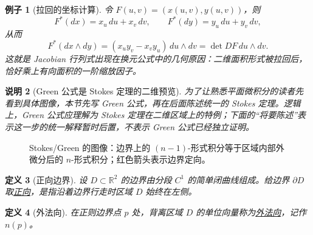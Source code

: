 \documentclass[UTF8,fontset=none,a4paper,11pt]{ctexart}
\theoremstyle{foundation-definition}
\newtheorem{definition}{定义}[section]
\theoremstyle{foundation-theorem}
\theoremstyle{foundation-proposition}
\theoremstyle{foundation-example}
\newtheorem{example}[definition]{例子}
\theoremstyle{foundation-remark}
\newtheorem{remark}[definition]{说明}
\theoremstyle{foundation-theorem}
\newcommand{\term}[2]{\hyperref[#1]{#2}}
\begin{document}
\begin{example}[拉回的坐标计算]
令 \(F(u,v)=(x(u,v),y(u,v))\)，则
\[
 F^*(dx)=x_u\,du+x_v\,dv,
 \qquad
 F^*(dy)=y_u\,du+y_v\,dv,
\]
从而
\[
 F^*(dx\wedge dy)
 =(x_uy_v-x_vy_u)\,du\wedge dv
 =\det DF\,du\wedge dv.
\]
这就是 Jacobian 行列式出现在换元公式中的几何原因：二维面积形式被拉回后，恰好乘上有向面积的一阶缩放因子。
\end{example}

\begin{remark}[Green 公式是 Stokes 定理的二维预览]
为了让熟悉平面微积分的读者先看到具体图像，本节先写 Green 公式，再在后面陈述统一的 Stokes 定理。逻辑上，Green 公式应理解为 Stokes 定理在二维区域上的特例；下面的“将要陈述”表示这一步的统一解释暂时后置，不表示 Green 公式已经独立证明。
\end{remark}

\begin{figure}[htbp]
\centering
{}
\caption{Stokes/Green 的图像：边界上的 \((n-1)\)-形式积分等于区域内部外微分后的 \(n\)-形式积分；红色箭头表示边界定向。}
\label{fig:stokes-boundary-region}
\end{figure}

\begin{definition}[正向边界]\label{def:positive-boundary}
设 \(D\subset\mathbb R^2\) 的边界由分段 \(C^1\) 的简单闭曲线组成。给边界
\(\partial D\) 取\term{def:positive-boundary}{正向}，是指沿着边界行走时区域 \(D\) 始终在左侧。
\end{definition}

\begin{definition}[外法向]\label{def:outward-normal}
在正则边界点 \(p\) 处，背离区域 \(D\) 的单位向量称为\term{def:outward-normal}{外法向}，记作 \(n(p)\)。
\end{definition}
\end{document}
